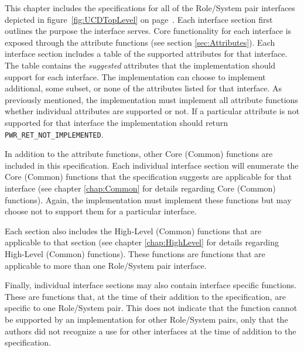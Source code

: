 \documentclass[12pt]{report} %
\begin{document}
This chapter includes the specifications for all of the Role/System pair interfaces depicted in figure~\ref{fig:UCDTopLevel} on page~\pageref{fig:UCDTopLevel}.
Each interface section first outlines the purpose the interface serves.
Core functionality for each interface is exposed through the attribute functions (see section \ref{sec:Attributes}).
Each interface section includes a table of the supported attributes for that interface. 
The table contains the \textit{suggested} attributes that the implementation should support for each interface. 
The implementation can choose to implement additional, some subset, or none of the attributes listed for that interface.
As previously mentioned, the implementation must implement all attribute functions whether individual attributes are supported or not.
If a particular attribute is not supported for that interface the implementation should return \texttt{PWR_RET_NOT_IMPLEMENTED}.

In addition to the attribute functions, other Core (Common) functions are included in this specification.
Each individual interface section will enumerate the Core (Common) functions that the specification suggests are applicable for that interface (see chapter \ref{chap:Common} for details regarding Core (Common) functions).
Again, the implementation must implement these functions but may choose not to support them for a particular interface.

Each section also includes the High-Level (Common) functions that are applicable to that section (see chapter \ref{chap:HighLevel} for details regarding High-Level (Common) functions).
These functions are functions that are applicable to more than one Role/System pair interface.

Finally, individual interface sections may also contain interface specific functions.
These are functions that, at the time of their addition to the specification, are specific to one Role/System pair. 
This does not indicate that the function cannot be supported by an implementation for other Role/System pairs, only that the authors did not recognize a use for other interfaces at the time of addition to the specification.
\end{document}
